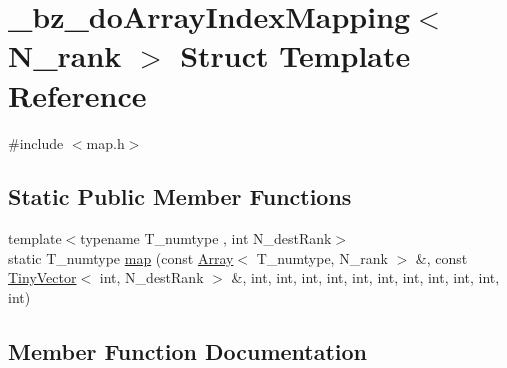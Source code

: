 \hypertarget{struct__bz__doArrayIndexMapping}{}\section{\+\_\+bz\+\_\+do\+Array\+Index\+Mapping$<$ N\+\_\+rank $>$ Struct Template Reference}
\label{struct__bz__doArrayIndexMapping}


{\ttfamily \#include $<$map.\+h$>$}

\subsection*{Static Public Member Functions}
\begin{DoxyCompactItemize}
\item 
{\footnotesize template$<$typename T\+\_\+numtype , int N\+\_\+dest\+Rank$>$ }\\static T\+\_\+numtype \hyperlink{struct__bz__doArrayIndexMapping_a292d68dd99857368d4e2187298507680}{map} (const \hyperlink{classArray}{Array}$<$ T\+\_\+numtype, N\+\_\+rank $>$ \&, const \hyperlink{classTinyVector}{Tiny\+Vector}$<$ int, N\+\_\+dest\+Rank $>$ \&, int, int, int, int, int, int, int, int, int, int, int)
\end{DoxyCompactItemize}


\subsection{Member Function Documentation}
\hypertarget{struct__bz__doArrayIndexMapping_a292d68dd99857368d4e2187298507680}{}
